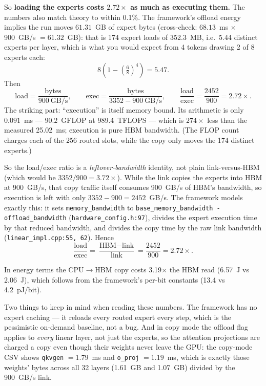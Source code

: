 \documentclass[11pt,a4paper]{report}
\begin{document}
So \textbf{loading the experts costs $2.72\times$ as much as executing them.} The numbers also match theory to within 0.1\%. The framework's offload energy implies the run moves $61.31$~GB of expert bytes (cross-check: $68.13$~ms $\times$ 900~GB/s $= 61.32$~GB): that is 174 expert loads of 352.3~MB, i.e.\ 5.44 distinct experts per layer, which is what you would expect from 4 tokens drawing 2 of 8 experts each:
\begin{equation}
8\left(1 - \left(\tfrac{6}{8}\right)^4\right) = 5.47.
\end{equation}
Then
\begin{equation}
\text{load} = \frac{\text{bytes}}{900\ \text{GB/s}},\qquad
\text{exec} = \frac{\text{bytes}}{3352 - 900\ \text{GB/s}},\qquad
\frac{\text{load}}{\text{exec}} = \frac{2452}{900} = 2.72\times.
\end{equation}
The striking part: ``execution'' is itself memory bound. Its arithmetic is only $0.091$~ms --- $90.2$~GFLOP at 989.4~TFLOPS --- which is $274\times$ less than the measured 25.02~ms; execution is pure HBM bandwidth. (The FLOP count charges each of the 256 routed slots, while the copy only moves the 174 distinct experts.)

So the load/exec ratio is a \textit{leftover-bandwidth} identity, not plain link-versus-HBM (which would be $3352/900 = 3.72\times$). While the link copies the experts into HBM at 900~GB/s, that copy traffic itself consumes 900~GB/s of HBM's bandwidth, so execution is left with only $3352 - 900 = 2452$~GB/s. The framework models exactly this: it sets \texttt{memory\_bandwidth} to \texttt{base\_memory\_bandwidth - offload\_bandwidth} (\texttt{hardware\_config.h:97}), divides the expert execution time by that reduced bandwidth, and divides the copy time by the raw link bandwidth (\texttt{linear\_impl.cpp:55, 62}). Hence
\begin{equation}
\frac{\text{load}}{\text{exec}} = \frac{\text{HBM} - \text{link}}{\text{link}} = \frac{2452}{900} = 2.72\times.
\end{equation}

In energy terms the CPU$\rightarrow$HBM copy costs 3.19$\times$ the HBM read (6.57~J vs 2.06~J), which follows from the framework's per-bit constants (13.4 vs 4.2~pJ/bit).

Two things to keep in mind when reading these numbers. The framework has no expert caching --- it reloads every routed expert every step, which is the pessimistic on-demand baseline, not a bug. And in copy mode the offload flag applies to \textit{every} linear layer, not just the experts, so the attention projections are charged a copy even though their weights never leave the GPU: the copy-mode CSV shows \texttt{qkvgen} $= 1.79$~ms and \texttt{o\_proj} $= 1.19$~ms, which is exactly those weights' bytes across all 32 layers (1.61~GB and 1.07~GB) divided by the 900~GB/s link.
\end{document}
